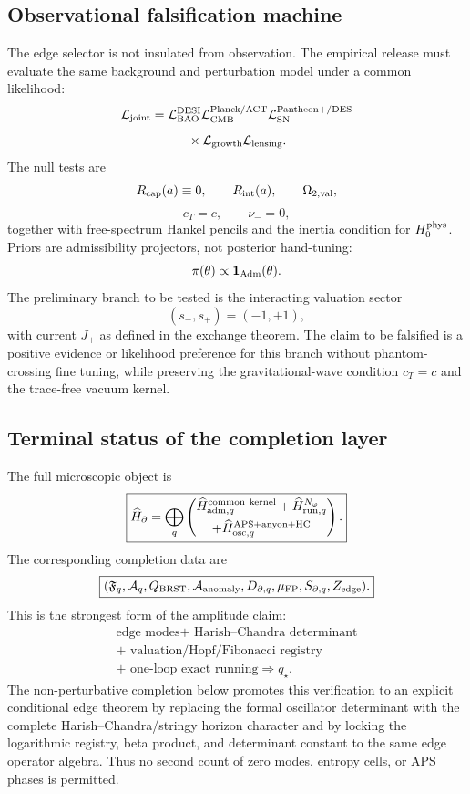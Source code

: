 \documentclass[aps,prd,reprint,nofootinbib,superscriptaddress,floatfix]{revtex4-2}
\numberwithin{equation}{section}
\theoremstyle{definition}
\theoremstyle{plain}
\begin{document}
\subsection{Observational falsification machine}

The edge selector is not insulated from observation.  The empirical release
must evaluate the same background and perturbation model under a common
likelihood:
\[
\mathcal L_{\rm joint}
=
\mathcal L_{\rm BAO}^{\rm DESI}
\mathcal L_{\rm CMB}^{\rm Planck/ACT}
\mathcal L_{\rm SN}^{\rm Pantheon+/DES}
\]
\[
{}\times
\mathcal L_{\rm growth}
\mathcal L_{\rm lensing}.
\]
The null tests are
\[
R_{\rm cap}(a)\equiv0,\qquad
R_{\rm int}(a),\qquad
\Omega_{2,{\rm val}},
\]
\[
c_T=c,\qquad
\nu_-=0,
\]
together with free-spectrum Hankel pencils and the inertia condition for
\(H_0^{\rm phys}\).  Priors are admissibility projectors, not posterior
hand-tuning:
\[
\pi(\theta)\propto
\mathbf 1_{\rm Adm}(\theta).
\]
The preliminary branch to be tested is the interacting valuation sector
\[
(s_-,s_+)=(-1,+1),
\]
with current \(J_+\) as defined in the exchange theorem.  The claim to be
falsified is a positive evidence or likelihood preference for this branch
without phantom-crossing fine tuning, while preserving the gravitational-wave
condition \(c_T=c\) and the trace-free vacuum kernel.

\subsection{Terminal status of the completion layer}

The full microscopic object is
\[
\boxed{
\widehat H_\partial
=
\bigoplus_q
\left(
\begin{gathered}
\widehat H_{{\rm adm},q}^{\rm common\ kernel}
+
\widehat H_{{\rm run},q}^{N_\varphi}
\\
+
\widehat H_{{\rm osc},q}^{\rm APS+anyon+HC}
\end{gathered}
\right).
}
\]
The corresponding completion data are
\[
\boxed{
(\mathfrak F_q,\mathcal A_q,Q_{\rm BRST},
\mathcal A_{\rm anomaly},D_{\partial,q},
\mu_{\rm FP},S_{\partial,q},Z_{\rm edge}).
}
\]
This is the strongest form of the amplitude claim:
\[
\boxed{
\begin{gathered}
\text{edge modes}
+\text{ Harish--Chandra determinant}
\\
+\text{ valuation/Hopf/Fibonacci registry}
\\
+\text{ one-loop exact running}
\Longrightarrow q_\star .
\end{gathered}
}
\]
The non-perturbative completion below promotes this verification to an explicit
conditional edge theorem by replacing the formal oscillator determinant
with the complete Harish--Chandra/stringy horizon character and by locking the
logarithmic registry, beta product, and determinant constant to the same edge
operator algebra.  Thus no second count of zero modes, entropy cells, or APS
phases is permitted.
\end{document}
